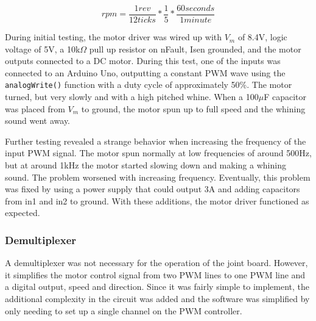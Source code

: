 \begin{equation}
rpm = \frac{1 rev}{12 ticks} * \frac{1}{5} * \frac{60 seconds}{1 minute}
\label{eqn:motor_driver_test}
\end{equation}

\noindent During initial testing, the motor driver was wired up with $V_m$ of 8.4V, logic voltage of 5V, a 10k$\Omega$ pull up resistor on nFault, Isen grounded, and the motor outputs connected to a DC motor. During this test, one of the inputs was connected to an Arduino Uno, outputting a constant PWM wave using the \texttt{analogWrite()} function with a duty cycle of approximately 50\%. The motor turned, but very slowly and with a high pitched whine. When a 100$\mu$F capacitor was placed from $V_m$ to ground, the motor spun up to full speed and the whining sound went away.

\noindent Further testing revealed a strange behavior when increasing the frequency of the input PWM signal. The motor spun normally at low frequencies of around 500Hz, but at around 1kHz the motor started slowing down and making a whining sound. The problem worsened with increasing frequency. Eventually, this problem was fixed by using a power supply that could output 3A and adding capacitors from in1 and in2 to ground. With these additions, the motor driver functioned as expected.


\subsubsection{Demultiplexer}
A demultiplexer was not necessary for the operation of the joint board. However, it simplifies the motor control signal from two PWM lines to one PWM line and a digital output, speed and direction. Since it was fairly simple to implement, the additional complexity in the circuit was added and the software was simplified by only needing to set up a single channel on the PWM controller.

